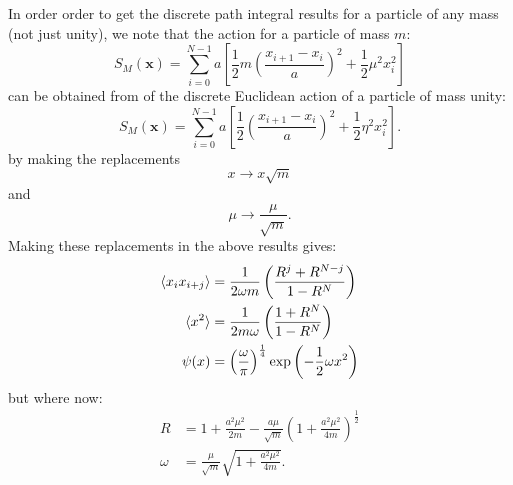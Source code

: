 \documentclass[12pt]{article}
\begin{document}
        In order order to get the discrete path integral results for a particle of any mass (not just unity), we note that the action for a particle of mass $m$:
        \begin{equation}
            \label{eq:ActionMassM}
            S_{M}\left(\bm{x}\right) = \sum_{i=0}^{N-1}a\left[\frac{1}{2}m\left(\frac{x_{i+1}-x_i}{a}\right)^2+\frac{1}{2}\mu^2 x_i^2\right]
        \end{equation}
        can be obtained from of the discrete Euclidean action of a particle of mass unity:
        \begin{equation}
            \label{eq:ActionMassUnity}
            S_{M}\left(\bm{x}\right) = \sum_{i=0}^{N-1}a\left[\frac{1}{2}\left(\frac{x_{i+1}-x_i}{a}\right)^2+\frac{1}{2}\eta^2x_i^2\right].
        \end{equation}
        by making the replacements
        \begin{equation}
            \label{eq:XRescaling}
            x\rightarrow x\sqrt{m}
        \end{equation}
        and
        \begin{equation}
            \label{eq:MuRescaling} 
            \mu \rightarrow \frac{\mu}{\sqrt{m}}. 
        \end{equation}
        Making these replacements in the above results gives:
        \begin{align}
            \braket{x_ix_{i+j}} & = \frac{1}{2\omega m}\left(\frac{R^j+R^{N-j}}{1-R^N}\right) \\
            \braket{x^2} & =\frac{1}{2m\omega}\left(\frac{1+R^N}{1-R^N}\right) \\
            \psi(x) & = \left(\frac{\omega}{\pi}\right)^\frac{1}{4}\exp\left(-\frac{1}{2}\omega x^2\right)
        \end{align}
        but where now:
        \begin{align}
            R & = 1 + \frac{a^2\mu^2}{2m}-\frac{a\mu}{\sqrt{m}}\left(1+\frac{a^2\mu^2}{4m}\right)^\frac{1}{2}\\
            \omega & = \frac{\mu}{\sqrt{m}}\sqrt{1+\frac{a^2\mu^2}{4m}}.
        \end{align}
\end{document}
